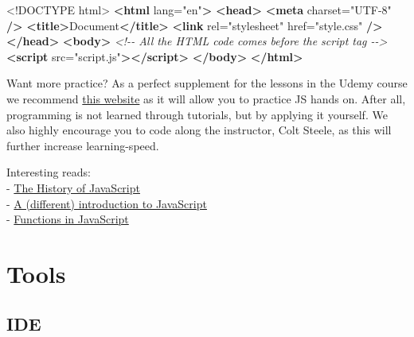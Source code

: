 \documentclass[
]{book}
\newenvironment{Shaded}{\begin{snugshade}}{\end{snugshade}}
\newcommand{\CommentTok}[1]{\textcolor[rgb]{0.56,0.35,0.01}{\textit{#1}}}
\newcommand{\DataTypeTok}[1]{\textcolor[rgb]{0.13,0.29,0.53}{#1}}
\newcommand{\KeywordTok}[1]{\textcolor[rgb]{0.13,0.29,0.53}{\textbf{#1}}}
\newcommand{\NormalTok}[1]{#1}
\newcommand{\OtherTok}[1]{\textcolor[rgb]{0.56,0.35,0.01}{#1}}
\newcommand{\StringTok}[1]{\textcolor[rgb]{0.31,0.60,0.02}{#1}}
\begin{document}
\begin{Shaded}
\begin{Highlighting}[]
\DataTypeTok{\textless{}!DOCTYPE }\NormalTok{html}\DataTypeTok{\textgreater{}}
\KeywordTok{\textless{}html}\OtherTok{ lang=}\StringTok{"en"}\KeywordTok{\textgreater{}}
  \KeywordTok{\textless{}head\textgreater{}}
    \KeywordTok{\textless{}meta}\OtherTok{ charset=}\StringTok{"UTF{-}8"} \KeywordTok{/\textgreater{}}
    \KeywordTok{\textless{}title\textgreater{}}\NormalTok{Document}\KeywordTok{\textless{}/title\textgreater{}}
    \KeywordTok{\textless{}link}\OtherTok{ rel=}\StringTok{"stylesheet"}\OtherTok{ href=}\StringTok{"style.css"} \KeywordTok{/\textgreater{}}
  \KeywordTok{\textless{}/head\textgreater{}}
  \KeywordTok{\textless{}body\textgreater{}}
    \CommentTok{\textless{}!{-}{-} All the HTML code comes before the script tag {-}{-}\textgreater{}}
    \KeywordTok{\textless{}script}\OtherTok{ src=}\StringTok{"script.js"}\KeywordTok{\textgreater{}\textless{}/script\textgreater{}}
  \KeywordTok{\textless{}/body\textgreater{}}
\KeywordTok{\textless{}/html\textgreater{}}
\end{Highlighting}
\end{Shaded}

Want more practice? As a perfect supplement for the lessons in the Udemy course we recommend \href{https://learnjavascript.online/}{this website} as it will allow you to practice JS hands on. After all, programming is not learned through tutorials, but by applying it yourself. We also highly encourage you to code along the instructor, Colt Steele, as this will further increase learning-speed.

Interesting reads:\\
- \href{https://medium.com/@_benaston/lesson-1a-the-history-of-javascript-8c1ce3bffb17}{The History of JavaScript}\\
- \href{https://javascript.info/intro}{A (different) introduction to JavaScript}\\
- \href{https://javascript.info/function-basics}{Functions in JavaScript}

\hypertarget{tools}{%
\chapter{Tools}\label{tools}}

\hypertarget{ide}{%
\section{IDE}\label{ide}}
\end{document}
